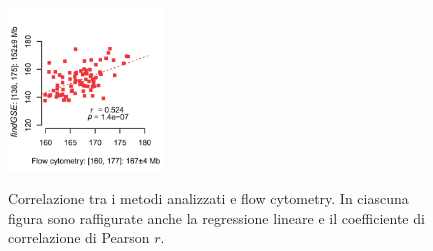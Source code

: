 \documentclass[crop=false, class=book]{standalone}
\begin{document}
\begin{figure}[p]
			{\includegraphics[width=0.37\textwidth]{capitoli/analisi/confronto/confronto1/m.png}} 
		\caption{Correlazione tra i metodi analizzati e flow cytometry. In ciascuna figura sono raffigurate anche la regressione lineare e il coefficiente di correlazione di Pearson $r$.}
		\label{fig:confronto6}
	\end{figure}
\end{document}
